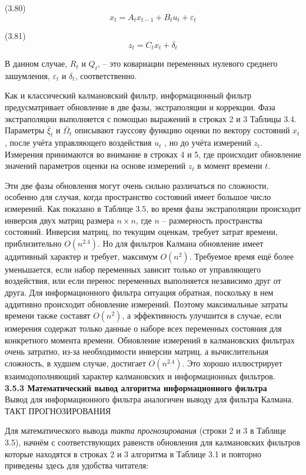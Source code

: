 \documentclass[10pt,a4paper]{article}
\begin{document}
(3.80)
$$x_t=A_t x_{t-1}+B_t u_t+\varepsilon_t$$

(3.81)
$$z_t=C_t x_t+\delta_t$$

В данном случае, $ R_t $ и $ Q_t $, – это ковариации переменных нулевого среднего зашумления, $\varepsilon_t$ и $\delta_t$, соответственно.
 
Как и классический калмановский фильтр, информационный фильтр предусматривает обновление в две фазы, экстраполяции и коррекции. Фаза экстраполяции выполняется с помощью выражений в строках 2 и 3 Таблицы 3.4. Параметры $\bar{\xi}_t$ и $\bar{\varOmega}_t$ описывают гауссову функцию оценки по вектору состояний $ x_t $,  после учёта управляющего воздействия $ u_t $ , но до учёта измерений $ z_t $. Измерения принимаются во внимание в строках 4 и 5, где происходит обновление значений параметров оценки на основе измерений $ z_t $ в момент времени $ t $.

Эти две фазы обновления могут очень сильно различаться по сложности, особенно для случая, когда пространство состояний имеет большое число измерений. Как показано в Таблице 3.5, во время фазы экстраполяции происходит инверсия двух матриц размера $n\times n$, где $n$ – размерность пространства состояний. Инверсия матриц, по текущим оценкам, требует затрат времени, приблизительно $O(n^{2.4})$. Но для фильтров Калмана обновление имеет аддитивный характер и требует, максимум $O(n^2)$. Требуемое время ещё более уменьшается, если набор переменных зависит только от управляющего воздействия, или если перенос переменных выполняется независимо друг от друга. Для информационного фильтра ситуация обратная, поскольку в нем аддитивно происходит обновление измерений. Поэтому максимальные затраты времени также составят $ O(n^2) $, а эффективность  улучшится в случае, если измерения содержат только данные о наборе всех переменных состояния для конкретного момента времени. Обновление измерений в калмановских фильтрах очень затратно, из-за необходимости инверсии матриц, а вычислительная сложность, в худшем случае, достигает $O(n^{2.4})$. Это хорошо иллюстрирует взаимодополняющий характер калмановских и информационных фильтров.\\

\textbf{3.5.3 Математический вывод алгоритма информационного фильтра}\\

Вывод для информационного фильтра аналогичен выводу для фильтра Калмана.\\
ТАКТ ПРОГНОЗИРОВАНИЯ

Для математического вывода \textit{такта прогнозирования} (строки 2 и 3 в Таблице 3.5), начнём с соответствующих равенств обновления для калмановских фильтров которые находятся в строках 2 и 3 алгоритма в Таблице 3.1 и повторно приведены здесь для удобства читателя:\\
\end{document}
